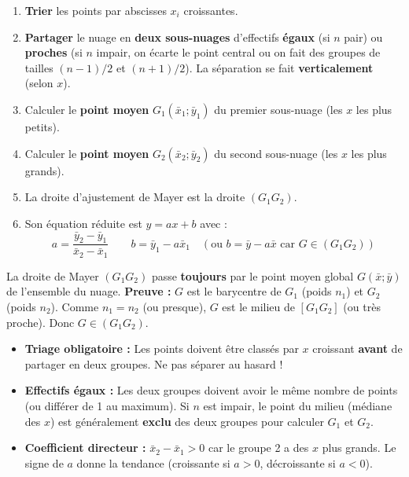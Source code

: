 \documentclass[11pt]{article}
\newcommand{\cle}[1]{{\popxbold\color{popdark}#1}}
\begin{document}
\begin{methode}
\begin{enumerate}
    \item \textbf{Trier} les points par abscisses $x_i$ croissantes.
    \item \textbf{Partager} le nuage en \textbf{deux sous-nuages} d'effectifs \textbf{égaux} (si $n$ pair) ou \textbf{proches} (si $n$ impair, on écarte le point central ou on fait des groupes de tailles $(n-1)/2$ et $(n+1)/2$). La séparation se fait \textbf{verticalement} (selon $x$).
    \item Calculer le \textbf{point moyen} $G_1(\bar{x}_1 ; \bar{y}_1)$ du premier sous-nuage (les $x$ les plus petits).
    \item Calculer le \textbf{point moyen} $G_2(\bar{x}_2 ; \bar{y}_2)$ du second sous-nuage (les $x$ les plus grands).
    \item La \cle{droite d'ajustement de Mayer} est la droite $(G_1G_2)$.
    \item Son équation réduite est $y = ax + b$ avec :
    \[ a = \frac{\bar{y}_2 - \bar{y}_1}{\bar{x}_2 - \bar{x}_1} \qquad b = \bar{y}_1 - a\bar{x}_1 \quad (\text{ou } b = \bar{y} - a\bar{x} \text{ car } G \in (G_1G_2)) \]
\end{enumerate}
\end{methode}

\begin{propriete}
La droite de Mayer $(G_1G_2)$ passe \textbf{toujours} par le point moyen global $G(\bar{x} ; \bar{y})$ de l'ensemble du nuage.
\textbf{Preuve :} $G$ est le barycentre de $G_1$ (poids $n_1$) et $G_2$ (poids $n_2$). Comme $n_1 = n_2$ (ou presque), $G$ est le milieu de $[G_1G_2]$ (ou très proche). Donc $G \in (G_1G_2)$.
\end{propriete}

\begin{attention}
\begin{itemize}
    \item \textbf{Triage obligatoire :} Les points doivent être classés par $x$ croissant \textbf{avant} de partager en deux groupes. Ne pas séparer au hasard !
    \item \textbf{Effectifs égaux :} Les deux groupes doivent avoir le même nombre de points (ou différer de 1 au maximum). Si $n$ est impair, le point du milieu (médiane des $x$) est généralement \textbf{exclu} des deux groupes pour calculer $G_1$ et $G_2$.
    \item \textbf{Coefficient directeur :} $\bar{x}_2 - \bar{x}_1 > 0$ car le groupe 2 a des $x$ plus grands. Le signe de $a$ donne la tendance (croissante si $a>0$, décroissante si $a<0$).
\end{itemize}
\end{attention}
\end{document}
